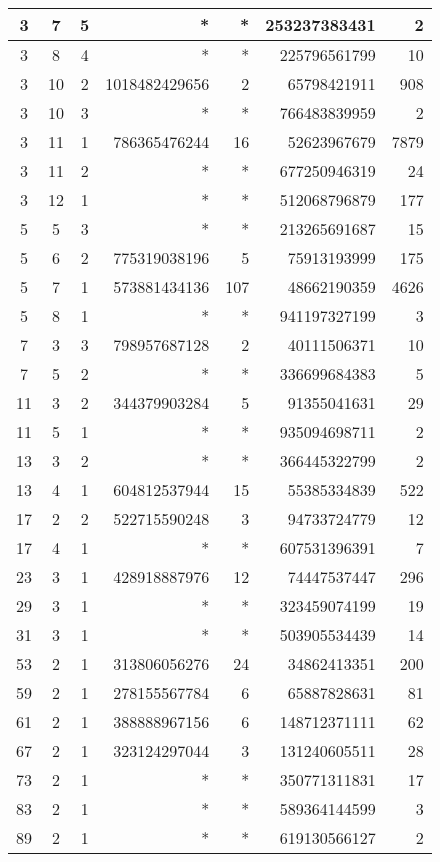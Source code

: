 \documentclass{mcom-l}
\theoremstyle{definition}
\begin{document}
\begin{longtable}[b]{| c | c | c || r | r | r | r |}
3	& 7	& 5	& *	& *	& 253237383431	& 2\\
\hline
3	& 8	& 4	& *	& *	& 225796561799	& 10\\
\hline
3	& 10	& 2	& 1018482429656	& 2	& 65798421911	& 908\\
\hline
3	& 10	& 3	& *	& *	& 766483839959	& 2\\
\hline
3	& 11	& 1	& 786365476244	& 16	& 52623967679	& 7879\\
\hline
3	& 11	& 2	& *	& *	& 677250946319	& 24\\
\hline
3	& 12	& 1	& *	& *	& 512068796879	& 177\\
\hline
5	& 5	& 3	& *	& *	& 213265691687	& 15\\
\hline
5	& 6	& 2	& 775319038196	& 5	& 75913193999	& 175\\
\hline
5	& 7	& 1	& 573881434136	& 107	& 48662190359	& 4626\\
\hline
5	& 8	& 1	& *	& *	& 941197327199	& 3\\
\hline
7	& 3	& 3	& 798957687128	& 2	& 40111506371	& 10\\
\hline
7	& 5	& 2	& *	& *	& 336699684383	& 5\\
\hline
11	& 3	& 2	& 344379903284	& 5	& 91355041631	& 29\\
\hline
11	& 5	& 1	& *	& *	& 935094698711	& 2\\
\hline
13	& 3	& 2	& *	& *	& 366445322799	& 2\\
\hline
13	& 4	& 1	& 604812537944	& 15	& 55385334839	& 522\\
\hline
17	& 2	& 2	& 522715590248	& 3	& 94733724779	& 12\\
\hline
17	& 4	& 1	& *	& *	& 607531396391	& 7\\
\hline
23	& 3	& 1	& 428918887976	& 12	& 74447537447	& 296\\
\hline
29	& 3	& 1	& *	& *	& 323459074199	& 19\\
\hline
31	& 3	& 1	& *	& *	& 503905534439	& 14\\
\hline
53	& 2	& 1	& 313806056276	& 24	& 34862413351	& 200\\
\hline
59	& 2	& 1	& 278155567784	& 6	& 65887828631	& 81\\
\hline
61	& 2	& 1	& 388888967156	& 6	& 148712371111	& 62\\
\hline
67	& 2	& 1	& 323124297044	& 3	& 131240605511	& 28\\
\hline
73	& 2	& 1	& *	& *	& 350771311831	& 17\\
\hline
83	& 2	& 1	& *	& *	& 589364144599	& 3\\
\hline
89	& 2	& 1	& *	& *	& 619130566127	& 2\\

\end{longtable}
\end{document}
